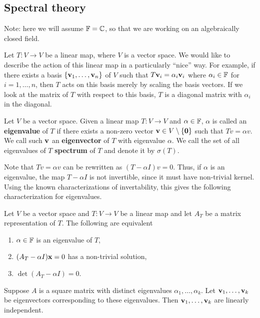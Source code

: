 \documentclass{article}
\begin{document}
\subsection{Spectral theory}

Note: here we will assume ${\mathbb{F}} = {\mathbb{C}}$, so that we are working on an algebraically closed field.


Let $T \colon V \to V$ be a linear map, where $V$ is a vector space.  We would like to describe the action of this linear map in a particularly ``nice'' way. For example, if there exists a basis $\{{\mathbf{v}}_1, \ldots, {\mathbf{v}}_n\}$ of $V$ such that $T{\mathbf{v}}_i = \alpha_i {\mathbf{v}}_i$ where $\alpha_i \in {\mathbb{F}}$ for $i = 1, \ldots, n$, then $T$ acts on this basis merely by scaling the basis vectors. If we look at the matrix of $T$ with respect to this basis, $T$ is a diagonal matrix with $\alpha_i$ in the diagonal. 

\begin{definition}
Let $V$ be a vector space. Given a linear map $T \colon V \to V$ and $\alpha \in {\mathbb{F}}$, $\alpha$ is called an \textbf{eigenvalue} of $T$ if there exists a non-zero vector ${\mathbf{v}} \in V\setminus\{{\mathbf{0}}\}$ such that $Tv = \alpha v$. We call such ${\mathbf{v}}$ an \textbf{eigenvector} of $T$ with eigenvalue $\alpha$. We call the set of all eigenvalues of $T$ \textbf{spectrum} of $T$ and denote it by $\sigma(T)$.
\end{definition}


Note that $Tv = \alpha v$ can be rewritten as $(T-\alpha I)v = 0$. Thus, if $\alpha $ is an eigenvalue, the map $T-\alpha I$ is not invertible, since it must have non-trivial kernel. Using the known characterizations of invertability, this gives the following characterization for eigenvalues. 

\begin{theorem}
Let $V$ be a vector space and $T \colon V \to V$ be a linear map and let $A_T$ be a matrix representation of $T$. The following are equivalent
\begin{enumerate}
    \item $\alpha\in {\mathbb{F}}$ is an eigenvalue of $T$,
    \item $(A_T-\alpha I)\mathbf{x} = 0$ has a non-trivial solution,
    \item $\det (A_T-\alpha I) = 0$.
\end{enumerate}
\end{theorem}

\begin{theorem}
Suppose $A$ is a square matrix with distinct eigenvalues $\alpha_1, \ldots, \alpha_k$. Let ${\mathbf{v}}_1, \ldots, {\mathbf{v}}_k$ be eigenvectors corresponding to these eigenvalues. Then ${\mathbf{v}}_1, \ldots, {\mathbf{v}}_k$ are linearly independent.
\end{theorem}
\end{document}
